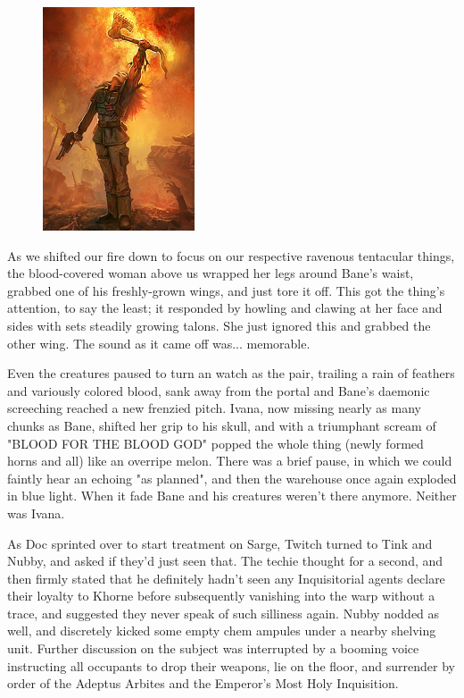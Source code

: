 \begin{figure}
	\begin{center}
		\includegraphics[width=\figwidth]{pics/19/57.png}
	\end{center}
\end{figure}
As we shifted our fire down to focus on our respective ravenous tentacular things, the blood-covered woman above us wrapped her legs around Bane's waist, grabbed one of his freshly-grown wings, and just tore it off. 
This got the thing's attention, to say the least; 
it responded by howling and clawing at her face and sides with sets steadily growing talons. 
She just ignored this and grabbed the other wing. 
The sound as it came off was... 
memorable. 


Even the creatures paused to turn an watch as the pair, trailing a rain of feathers and variously colored blood, sank away from the portal and Bane's daemonic screeching reached a new frenzied pitch. 
Ivana, now missing nearly as many chunks as Bane, shifted her grip to his skull, and with a triumphant scream of "BLOOD FOR THE BLOOD GOD" popped the whole thing (newly formed horns and all) like an overripe melon. 
There was a brief pause, in which we could faintly hear an echoing "as planned", and then the warehouse once again exploded in blue light. 
When it fade Bane and his creatures weren't there anymore. 
Neither was Ivana. 


As Doc sprinted over to start treatment on Sarge, Twitch turned to Tink and Nubby, and asked if they'd just seen that. 
The techie thought for a second, and then firmly stated that he definitely hadn't seen any Inquisitorial agents declare their loyalty to Khorne before subsequently vanishing into the warp without a trace, and suggested they never speak of such silliness again. 
Nubby nodded as well, and discretely kicked some empty chem ampules under a nearby shelving unit. 
Further discussion on the subject was interrupted by a booming voice instructing all occupants to drop their weapons, lie on the floor, and surrender by order of the Adeptus Arbites and the Emperor's Most Holy Inquisition.

